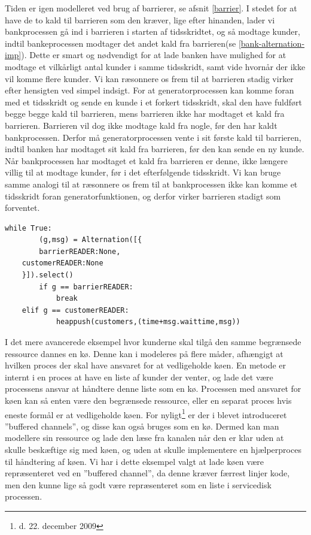 Tiden er igen modelleret ved brug af barrierer, se afsnit \cref{barrier}. I 
stedet for at have de to kald til barrieren som den kræver, lige efter hinanden, lader 
vi bankprocessen gå ind i barrieren i starten af tidsskridtet, og så modtage 
kunder, indtil bankeprocessen modtager det andet kald fra barrieren(se \cref{bank-alternation-imp}). 
Dette er smart og nødvendigt for at lade banken have mulighed for 
at modtage et vilkårligt antal kunder i samme tidsskridt, samt vide hvornår der 
ikke vil komme flere kunder.  
Vi kan ræsonnere os frem til at barrieren stadig virker efter hensigten ved  simpel indsigt.
For at generatorprocessen kan komme foran med et tidsskridt og sende en kunde i et forkert tidsskridt,
skal den have fuldført begge begge kald til barrieren, mens barrieren ikke har modtaget et kald fra barrieren. Barrieren vil dog ikke modtage kald fra nogle, før den har  kaldt bankprocessen. Derfor må generatorprocessen vente i sit første kald til barrieren, indtil banken har modtaget 
sit kald fra barrieren, før den kan sende en ny kunde.
Når bankprocessen har modtaget et kald fra barrieren 
er denne, ikke længere villig til at modtage kunder,  før i det efterfølgende 
tidsskridt. Vi kan bruge samme analogi til at 
ræsonnere os frem til at bankprocessen ikke kan komme et tidsskridt foran 
generatorfunktionen, og derfor virker barrieren stadigt som forventet. 

\begin{lstlisting}[float=hbtp,label=bank-alternation-imp,caption=Modtage en kunde eller 
	barrier i Bankprocessen]
while True:
		(g,msg) = Alternation([{
		barrierREADER:None,
    customerREADER:None
    }]).select()
		if g == barrierREADER:
			break
    elif g == customerREADER:
			heappush(customers,(time+msg.waittime,msg))
\end{lstlisting}


I det mere avancerede eksempel hvor kunderne skal tilgå den samme begrænsede 
ressource dannes en kø. Denne kan i \pycsp modeleres på flere måder, afhængigt 
at hvilken proces der skal have ansvaret for at vedligeholde køen. En metode er 
internt i en proces at have en liste af kunder der venter, og lade det være 
processens ansvar at håndtere denne liste som en kø. Processen med ansvaret for køen kan 
så enten være den begrænsede ressource, eller en separat proces hvis eneste 
formål er at vedligeholde køen. For nyligt\footnote{d. 22. december 2009} er 
der i \pycsp blevet introduceret ''buffered channels''\cite{pycsp-r147}, og 
disse kan også bruges som en kø. Dermed kan man modellere sin ressource og lade 
den læse fra kanalen når den er klar uden at skulle beskæftige sig med køen, og 
uden at skulle implementere en hjælperproces til håndtering af køen. Vi har i 
dette eksempel valgt at lade køen være repræsenteret ved en ''buffered 
channel'', da denne  kræver færrest linjer kode, men den kunne lige så godt 
være repræsenteret som en liste i servicedisk processen.


